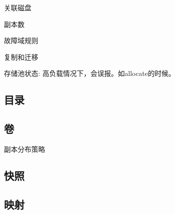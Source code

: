 关联磁盘

副本数

故障域规则

复制和迁移

存储池状态: 高负载情况下，会误报。如allocate的时候。

\subsection{目录}

\subsection{卷}

副本分布策略

\subsection{快照}

\subsection{映射}
